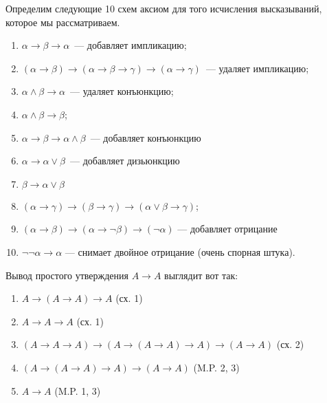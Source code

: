 Определим следующие 10 схем аксиом для того исчисления высказываний, которое мы рассматриваем. 
\begin{enumerate}
    \item $\alpha \to \beta \to \alpha$~--- добавляет импликацию;
    \item $(\alpha \to \beta) \to (\alpha \to \beta \to \gamma) \to (\alpha \to \gamma)$~--- удаляет импликацию;
    \item $\alpha \land \beta \to \alpha$~--- удаляет конъюнкцию;
    \item $\alpha \land \beta \to \beta$;
    \item $\alpha \to \beta \to \alpha \land \beta$~--- добавляет конъюнкцию
    \item $\alpha \to \alpha \lor \beta$~--- добавляет дизьюнкцию
    \item $\beta \to \alpha \lor \beta$
    \item $(\alpha \to \gamma) \to (\beta \to \gamma) \to (\alpha \lor \beta \to \gamma)$; 
    \item $(\alpha \to \beta) \to (\alpha \to \neg \beta) \to (\neg \alpha)$ --- добавляет отрицание
    \item $\neg \neg \alpha \to \alpha$ --- снимает двойное отрицание (очень спорная штука).
\end{enumerate}

Вывод простого утверждения $A\to A$ выглядит вот так:
\begin{enumerate}\itemsep=-1mm
    \item $A\to \left( A \to A \right) \to A$ (сх. 1)
    \item $A\to A\to A$ (сх. 1)
    \item $\left( A\to A\to A \right) \to \left( A\to \left( A\to A \right) \to A \right) \to \left( A\to A \right)$ (сх. 2)
    \item $\left( A\to \left( A\to A \right) \to A \right) \to \left( A\to A \right)$ (M.P. 2, 3)
    \item $A\to A$ (M.P. 1, 3)
\end{enumerate}

\endinput
